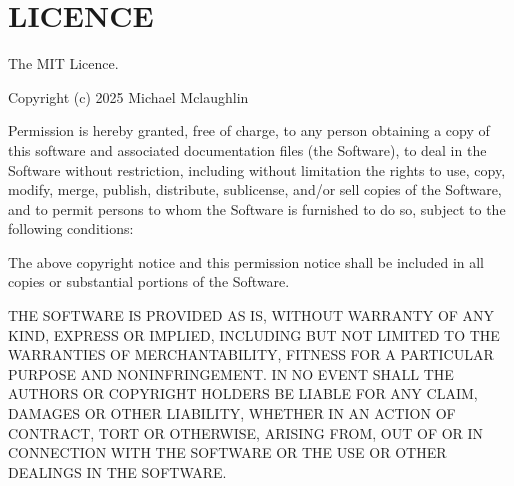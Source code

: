 \chapter{LICENCE }
\hypertarget{md__c_1_2xampp_2htdocs_2_g_pagos_ayuntamiento_2node__modules_2decimal_8js_2_l_i_c_e_n_c_e}{}\label{md__c_1_2xampp_2htdocs_2_g_pagos_ayuntamiento_2node__modules_2decimal_8js_2_l_i_c_e_n_c_e}
The MIT Licence.

Copyright (c) 2025 Michael Mclaughlin

Permission is hereby granted, free of charge, to any person obtaining a copy of this software and associated documentation files (the \textquotesingle{}Software\textquotesingle{}), to deal in the Software without restriction, including without limitation the rights to use, copy, modify, merge, publish, distribute, sublicense, and/or sell copies of the Software, and to permit persons to whom the Software is furnished to do so, subject to the following conditions\+:

The above copyright notice and this permission notice shall be included in all copies or substantial portions of the Software.

THE SOFTWARE IS PROVIDED \textquotesingle{}AS IS\textquotesingle{}, WITHOUT WARRANTY OF ANY KIND, EXPRESS OR IMPLIED, INCLUDING BUT NOT LIMITED TO THE WARRANTIES OF MERCHANTABILITY, FITNESS FOR A PARTICULAR PURPOSE AND NONINFRINGEMENT. IN NO EVENT SHALL THE AUTHORS OR COPYRIGHT HOLDERS BE LIABLE FOR ANY CLAIM, DAMAGES OR OTHER LIABILITY, WHETHER IN AN ACTION OF CONTRACT, TORT OR OTHERWISE, ARISING FROM, OUT OF OR IN CONNECTION WITH THE SOFTWARE OR THE USE OR OTHER DEALINGS IN THE SOFTWARE. 
